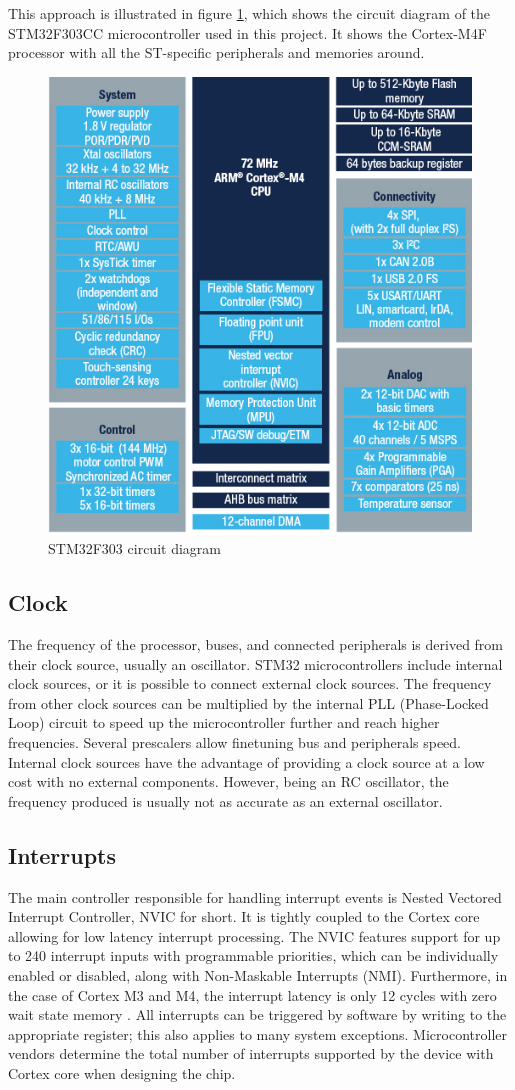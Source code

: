 This approach is illustrated in figure \ref{fig:f303}, which shows the circuit diagram of the STM32F303CC microcontroller used in this project. It shows the Cortex-M4F processor with all the ST-specific peripherals and memories around.
\begin{figure}
\centering
\includegraphics[width=0.6\linewidth]{support/pic/en.bd_stm32f303.jpg}
\caption{STM32F303 circuit diagram \cite{f303_diagram}} %
\label{fig:f303}
\end{figure}

	\subsection{Clock}
	\label{sub:clock}
The frequency of the processor, buses, and connected peripherals is derived from their clock source, usually an oscillator. STM32 microcontrollers include internal clock sources, or it is possible to connect external clock sources. The frequency from other clock sources can be multiplied by the internal PLL (Phase-Locked Loop) circuit to speed up the microcontroller further and reach higher frequencies. Several prescalers allow finetuning bus and peripherals speed. Internal clock sources have the advantage of providing a clock source at a low cost with no external components. However, being an RC oscillator, the frequency produced is usually not as accurate as an external oscillator.

	\subsection{Interrupts}
	\label{sub:nvic}
The main controller responsible for handling interrupt events is Nested Vectored Interrupt Controller, NVIC for short. It is tightly coupled to the Cortex core allowing for low latency interrupt processing. The NVIC features support for up to 240 interrupt inputs with programmable priorities, which can be individually enabled or disabled, along with Non-Maskable Interrupts (NMI). Furthermore, in the case of Cortex M3 and M4, the interrupt latency is only 12 cycles with zero wait state memory \cite{yu}. All interrupts can be triggered by software by writing to the appropriate register; this also applies to many system exceptions. Microcontroller vendors determine the total number of interrupts supported by the device with Cortex core when designing the chip.

